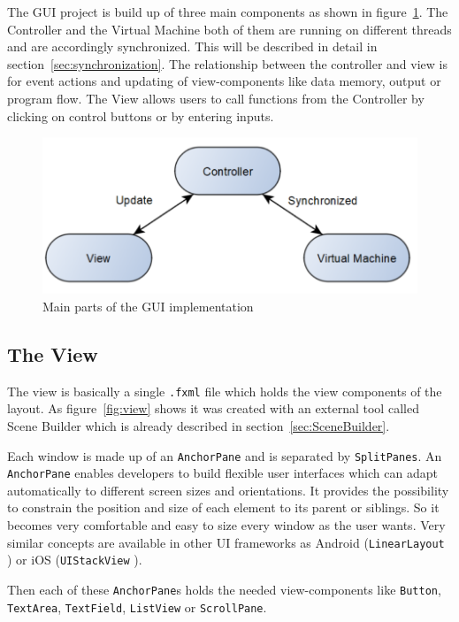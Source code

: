 The GUI project is build up of three main components as shown in figure~\ref{fig:partsOfGui}. The Controller and the Virtual Machine both of them are running on different threads and are accordingly synchronized. This will be described in detail in section~\ref{sec:synchronization}. The relationship between the controller and view is for event actions and updating of view-components like data memory, output or program flow. The View allows users to call functions from the Controller by clicking on control buttons or by entering inputs. 
\begin{figure}[h] 
	\centering
	\includegraphics[scale=.70]{images/modelOfGui.png}
	\caption{Main parts of the GUI implementation}
	\label{fig:partsOfGui}
\end{figure}
\subsection{The View}\label{sec:TreeView}
The view is basically a single \lstinline$.fxml$ file which holds the view components of the layout. As figure~\ref{fig:view} shows it was created with an external tool called Scene Builder which is already described in section~\ref{sec:SceneBuilder}.

Each window is made up of an \lstinline$AnchorPane$ \cite{anchorpane_anchorpane_nodate} and is separated by \lstinline$SplitPanes$. An \lstinline$AnchorPane$ enables developers to build flexible user interfaces which can adapt automatically to different screen sizes and orientations. It provides the possibility to constrain the position and size of each element to its parent or siblings. So it becomes very comfortable and easy to size every window as the user wants. Very similar concepts are available in other UI frameworks as Android (\lstinline$LinearLayout$ \cite{android_linearlayout_nodate}) or iOS (\lstinline$UIStackView$ \cite{apple_uistackview_nodate}).

Then each of these \lstinline$AnchorPane$s holds the needed view-components like \lstinline$Button$, \lstinline$TextArea$, \lstinline$TextField$, \lstinline$ListView$ or \lstinline$ScrollPane$.

